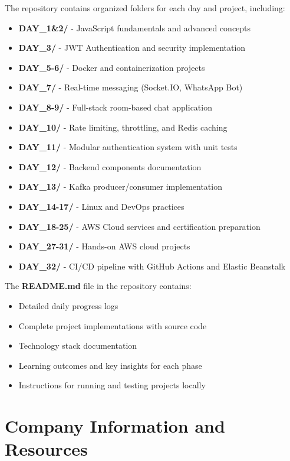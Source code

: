 \vspace{0.5cm}

The repository contains organized folders for each day and project, including:

\begin{itemize}
    \item \textbf{DAY\_1\&2/} - JavaScript fundamentals and advanced concepts
    \item \textbf{DAY\_3/} - JWT Authentication and security implementation
    \item \textbf{DAY\_5-6/} - Docker and containerization projects
    \item \textbf{DAY\_7/} - Real-time messaging (Socket.IO, WhatsApp Bot)
    \item \textbf{DAY\_8-9/} - Full-stack room-based chat application
    \item \textbf{DAY\_10/} - Rate limiting, throttling, and Redis caching
    \item \textbf{DAY\_11/} - Modular authentication system with unit tests
    \item \textbf{DAY\_12/} - Backend components documentation
    \item \textbf{DAY\_13/} - Kafka producer/consumer implementation
    \item \textbf{DAY\_14-17/} - Linux and DevOps practices
    \item \textbf{DAY\_18-25/} - AWS Cloud services and certification preparation
    \item \textbf{DAY\_27-31/} - Hands-on AWS cloud projects
    \item \textbf{DAY\_32/} - CI/CD pipeline with GitHub Actions and Elastic Beanstalk
\end{itemize}

The \textbf{README.md} file in the repository contains:
\begin{itemize}
    \item Detailed daily progress logs
    \item Complete project implementations with source code
    \item Technology stack documentation
    \item Learning outcomes and key insights for each phase
    \item Instructions for running and testing projects locally
\end{itemize}

\section{Company Information and Resources}

